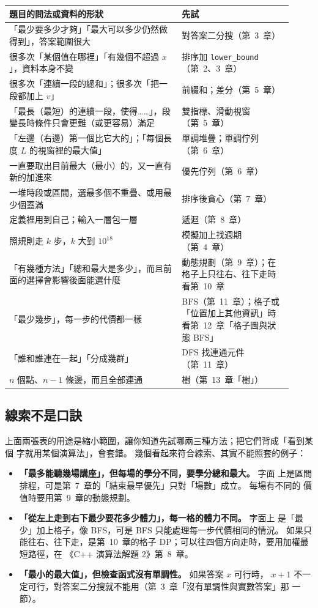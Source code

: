 \begin{center}
\begin{tabular}{p{0.56\linewidth}p{0.36\linewidth}}
\toprule
題目的問法或資料的形狀 & 先試 \\
\midrule
「最少要多少才夠」「最大可以多少仍然做得到」，答案範圍很大 & 對答案二分搜（第~3~章） \\
很多次「某個值在哪裡」「有幾個不超過 $x$」，資料本身不變 & 排序加 \texttt{lower\_bound}（第~2、3~章） \\
很多次「連續一段的總和」；很多次「把一段都加上 $v$」 & 前綴和；差分（第~5~章） \\
「最長（最短）的連續一段，使得……」，段變長時條件只會更難（或更容易）滿足 & 雙指標、滑動視窗（第~5~章） \\
「左邊（右邊）第一個比它大的」；「每個長度 $L$ 的視窗裡的最大值」 & 單調堆疊；單調佇列（第~6~章） \\
一直要取出目前最大（最小）的，又一直有新的加進來 & 優先佇列（第~6~章） \\
一堆時段或區間，選最多個不重疊、或用最少個蓋滿 & 排序後貪心（第~7~章） \\
定義裡用到自己；輸入一層包一層 & 遞迴（第~8~章） \\
照規則走 $k$ 步，$k$ 大到 $10^{18}$ & 模擬加上找週期（第~4~章） \\
「有幾種方法」「總和最大是多少」，而且前面的選擇會影響後面能選什麼 & 動態規劃（第~9~章）；在格子上只往右、往下走時看第~10~章 \\
「最少幾步」，每一步的代價都一樣 & BFS（第~11~章）；格子或「位置加上其他資訊」時看第~12~章「格子圖與狀態 BFS」 \\
「誰和誰連在一起」「分成幾群」 & DFS 找連通元件（第~11~章） \\
$n$ 個點、$n - 1$ 條邊，而且全部連通 & 樹（第~13~章「樹」） \\
\bottomrule
\end{tabular}
\end{center}

\subsection{線索不是口訣}

上面兩張表的用途是縮小範圍，讓你知道先試哪兩三種方法；把它們背成「看到某個
字就用某個演算法」，會套錯。 幾個看起來符合線索、其實不能照套的例子：

\begin{itemize}
\item \textbf{「最多能聽幾場講座」，但每場的學分不同，要學分總和最大。} 字面
上是區間排程，可是第~7~章的「結束最早優先」只對「場數」成立。 每場有不同的
價值時要用第~9~章的動態規劃。
\item \textbf{「從左上走到右下最少要花多少體力」，每一格的體力不同。} 字面上
是「最少」加上格子，像 BFS，可是 BFS 只能處理每一步代價相同的情況。 如果只
能往右、往下走，是第~10~章的格子 DP；可以往四個方向走時，要用加權最短路徑，在
《C++ 演算法解題 2》第~8~章。
\item \textbf{「最小的最大值」，但檢查函式沒有單調性。} 如果答案 $x$ 可行時，
$x + 1$ 不一定可行，對答案二分搜就不能用（第~3~章「沒有單調性與實數答案」那
一節）。
\end{itemize}

